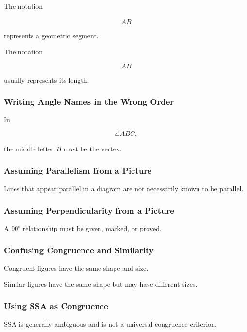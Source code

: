 The notation

\[ \overline{AB} \]

represents a geometric segment.

The notation

\[ AB \]

usually represents its length.

\subsubsection{Writing Angle Names in the Wrong Order}

In

\[ \angle ABC, \]

the middle letter \(B\) must be the vertex.

\subsubsection{Assuming Parallelism from a Picture}

Lines that appear parallel in a diagram are not necessarily known to be
parallel.

\subsubsection{Assuming Perpendicularity from a Picture}

A \(90^\circ\) relationship must be given, marked, or proved.

\subsubsection{Confusing Congruence and Similarity}

Congruent figures have the same shape and size.

Similar figures have the same shape but may have different sizes.

\subsubsection{Using SSA as Congruence}

SSA is generally ambiguous and is not a universal congruence criterion.

